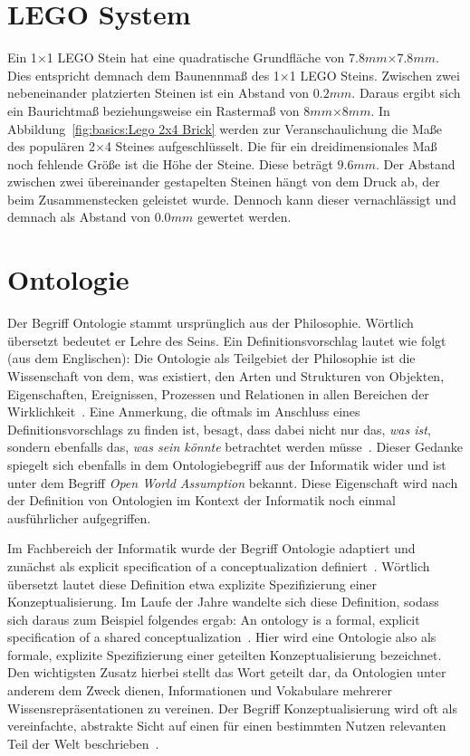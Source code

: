 \section{LEGO System}\label{basics:lego}
Ein 1$\times$1 LEGO Stein hat eine quadratische Grundfläche von \(7.8 mm\)$\times$\(7.8 mm\).
Dies entspricht demnach dem Baunennmaß des 1$\times$1 LEGO Steins.
Zwischen zwei nebeneinander platzierten Steinen ist ein Abstand von  \(0.2 mm\).
Daraus ergibt sich ein Baurichtmaß beziehungsweise ein Rastermaß von \(8 mm\)$\times$\(8 mm\).
In Abbildung~\ref{fig:basics:Lego 2x4 Brick} werden zur Veranschaulichung die Maße des populären 2$\times$4 Steines aufgeschlüsselt.
Die für ein dreidimensionales Maß noch fehlende Größe ist die Höhe der Steine.
Diese beträgt \(9.6 mm\).
Der Abstand zwischen zwei übereinander gestapelten Steinen hängt von dem Druck ab, der beim Zusammenstecken geleistet wurde.
Dennoch kann dieser vernachlässigt und demnach als Abstand von \(0.0 mm\) gewertet werden.

\section{Ontologie}\label{basics:ontologie}
Der Begriff Ontologie stammt ursprünglich aus der Philosophie.
Wörtlich übersetzt bedeutet er \glqq{}Lehre des Seins\grqq{}.
Ein Definitionsvorschlag lautet wie folgt (aus dem Englischen):
\glqq{}Die Ontologie als Teilgebiet der Philosophie ist die Wissenschaft von dem, was existiert, den Arten und Strukturen von Objekten, Eigenschaften, Ereignissen, Prozessen und Relationen in allen Bereichen der Wirklichkeit\grqq{}~\cite{Ontology}.
Eine Anmerkung, die oftmals im Anschluss eines Definitionsvorschlags zu finden ist, besagt, dass dabei nicht nur das, \textit{was ist}, sondern ebenfalls das, \textit{was sein könnte} betrachtet werden müsse~\cite{Ontology}\cite{OntologieDefinitionLMU:online}.
Dieser Gedanke spiegelt sich ebenfalls in dem Ontologiebegriff aus der Informatik wider und ist unter dem Begriff \textit{Open World Assumption} bekannt.
Diese Eigenschaft wird nach der Definition von Ontologien im Kontext der Informatik noch einmal ausführlicher aufgegriffen.

Im Fachbereich der Informatik wurde der Begriff Ontologie adaptiert und zunächst als \glqq{}explicit specification of a conceptualization\grqq{} definiert~\cite{Gruber1993}.
Wörtlich übersetzt lautet diese Definition etwa \glqq{}explizite Spezifizierung einer Konzeptualisierung\grqq{}.
Im Laufe der Jahre wandelte sich diese Definition, sodass sich daraus zum Beispiel folgendes ergab: \glqq{}An ontology is a formal, explicit specification of a shared conceptualization\grqq{}~\cite{Studer1998}.
Hier wird eine Ontologie also als \glqq{}formale, explizite Spezifizierung einer geteilten Konzeptualisierung\grqq{} bezeichnet.
Den wichtigsten Zusatz hierbei stellt das Wort \glqq{}geteilt\grqq{} dar, da Ontologien unter anderem dem Zweck dienen, Informationen und Vokabulare mehrerer Wissensrepräsentationen zu vereinen.
Der Begriff Konzeptualisierung wird oft als \glqq{}vereinfachte, abstrakte Sicht auf einen für einen bestimmten Nutzen relevanten Teil der Welt\grqq{} beschrieben~\cite{Guarino2009}.

